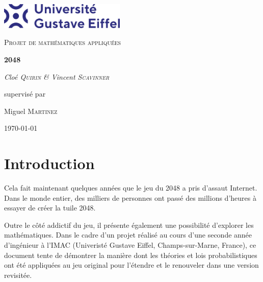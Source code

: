 \documentclass[12pt]{report}
\begin{document}
\begin{titlepage}

\centering

\includegraphics[width=0.45\textwidth]{images/gustave-eiffel-university.png}\par\vspace{1cm}

{\scshape\Large Projet de mathématiques appliquées\par}

\vspace{1.5cm}

{\huge\bfseries 2048\par}

\vspace{2cm}

{\Large\itshape Cloé \textsc{Quirin} \& Vincent \textsc{Scavinner}\par}

\vfill
supervisé par\par
Miguel \textsc{Martinez}
\vfill

{\large \today\par}

\end{titlepage}

\begin{abstract}
Rapport de projet documentant la réflexion et les choix d'implémentation réalisés dans le cadre de la conception d'une version revisitée du jeu 2048, utilisant des lois de probabilités mathématiques. 
\end{abstract}

\chapter{Introduction}

\tabto{1cm}Cela fait maintenant quelques années que le jeu du 2048 a pris d'assaut Internet.
Dans le monde entier, des milliers de personnes ont passé des millions d'heures à
essayer de créer la tuile 2048.

\vspace{0.5cm}

\tabto{1cm}Outre le côté addictif du jeu, il présente également une possibilité
d'explorer les mathématiques. Dans le cadre d'un projet réalisé au cours d'une seconde année d'ingénieur
à l'IMAC (Univeristé Gustave Eiffel, Champs-sur-Marne, France), ce document tente de
démontrer la manière dont les théories et lois probabilistiques ont été appliquées au jeu
original pour l'étendre et le renouveler dans une version revisitée.
\end{document}
